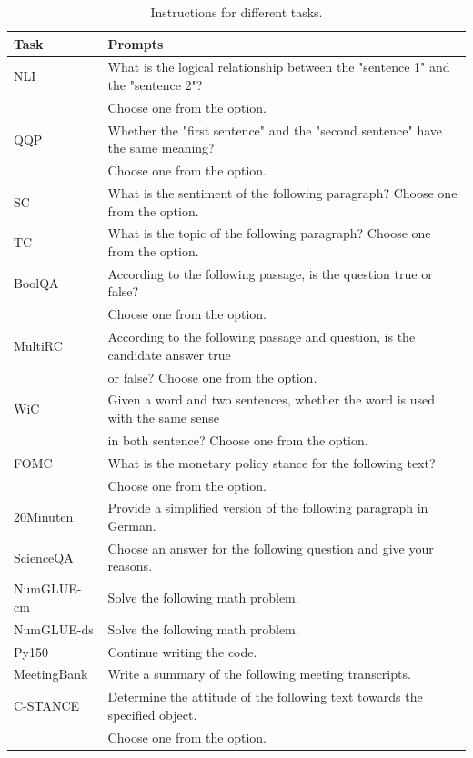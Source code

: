 \begin{table}[htbp]
\centering
\begin{tabular}{ll}
\toprule
\textbf{Task} & \textbf{Prompts} \\
\midrule
NLI & What is the logical relationship between the "sentence 1" and the "sentence 2"? \\
    & Choose one from the option. \\
QQP & Whether the "first sentence" and the "second sentence" have the same meaning? \\
    & Choose one from the option. \\
SC  & What is the sentiment of the following paragraph? Choose one from the option. \\
TC  & What is the topic of the following paragraph? Choose one from the option. \\
BoolQA & According to the following passage, is the question true or false? \\
       & Choose one from the option. \\
MultiRC & According to the following passage and question, is the candidate answer true \\
        & or false? Choose one from the option. \\
WiC & Given a word and two sentences, whether the word is used with the same sense \\
    & in both sentence? Choose one from the option. \\
FOMC & What is the monetary policy stance for the following text? \\
& Choose one from the option. \\
20Minuten & Provide a simplified version of the following paragraph in German.\\
ScienceQA & Choose an answer for the following question and give your reasons. \\
NumGLUE-cm & Solve the following math problem. \\
NumGLUE-ds & Solve the following math problem. \\
Py150 & Continue writing the code.\\
MeetingBank & Write a summary of the following meeting transcripts.\\
C-STANCE & Determine the attitude of the following text towards the specified object. \\ 
&Choose one from the option. \\

\bottomrule
\end{tabular}
\caption{Instructions for different tasks.}
\label{tab:task_prompts}
\end{table}
